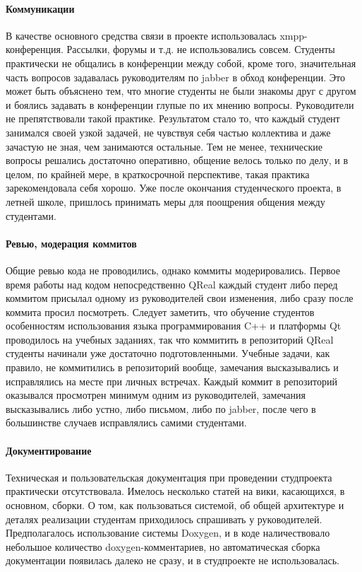\documentclass[a5paper]{article}
\begin{document}
\paragraph{Коммуникации}
В качестве основного средства связи в проекте использовалась xmpp-конференция. Рассылки, форумы и т.д. не использовались совсем. Студенты практически не общались в конференции между собой, кроме того, значительная часть вопросов задавалась руководителям по jabber в обход конференции. Это может быть объяснено тем, что многие студенты не были знакомы друг с другом и боялись задавать в конференции глупые по их мнению вопросы. Руководители не препятствовали такой практике. Результатом стало то, что каждый студент занимался своей узкой задачей, не чувствуя себя частью коллектива и даже зачастую не зная, чем занимаются остальные. Тем не менее, технические вопросы решались достаточно оперативно, общение велось только по делу, и в целом, по крайней мере, в краткосрочной перспективе, такая практика зарекомендовала себя хорошо. Уже после окончания студенческого проекта, в летней школе, пришлось принимать меры для поощрения общения между студентами.

\paragraph{Ревью, модерация коммитов}
Общие ревью кода не проводились, однако коммиты модерировались. Первое время работы над кодом непосредственно QReal каждый студент либо перед коммитом присылал одному из руководителей свои изменения, либо сразу после коммита просил посмотреть. Следует заметить, что обучение студентов особенностям использования языка программирования C++ и платформы Qt проводилось на учебных заданиях, так что коммитить в репозиторий QReal студенты начинали уже достаточно подготовленными. Учебные задачи, как правило, не коммитились в репозиторий вообще, замечания высказывались и исправлялись на месте при личных встречах. Каждый коммит в репозиторий оказывался просмотрен минимум одним из руководителей, замечания высказывались либо устно, либо письмом, либо по jabber, после чего в большинстве случаев исправлялись самими студентами.

\paragraph{Документирование}
Техническая и пользовательская документация при проведении студпроекта практически отсутствовала. Имелось несколько статей на вики, касающихся, в основном, сборки. О том, как пользоваться системой, об общей архитектуре и деталях реализации студентам приходилось спрашивать у руководителей. Предполагалось использование системы Doxygen, и в коде наличествовало небольшое количество doxygen-комментариев, но автоматическая сборка документации появилась далеко не сразу, и в студпроекте не использовалась.
\end{document}
